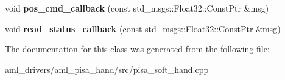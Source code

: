 \begin{DoxyCompactItemize}
\item 
\hypertarget{class_pisa_soft_hand_afece44618b89e2c0553a206a0729b03e}{void {\bfseries pos\-\_\-cmd\-\_\-callback} (const std\-\_\-msgs\-::\-Float32\-::\-Const\-Ptr \&msg)}\label{class_pisa_soft_hand_afece44618b89e2c0553a206a0729b03e}

\item 
\hypertarget{class_pisa_soft_hand_afe62272619863f9e7194336f1eb58b22}{void {\bfseries read\-\_\-status\-\_\-callback} (const std\-\_\-msgs\-::\-Float32\-::\-Const\-Ptr \&msg)}\label{class_pisa_soft_hand_afe62272619863f9e7194336f1eb58b22}

\end{DoxyCompactItemize}


The documentation for this class was generated from the following file\-:\begin{DoxyCompactItemize}
\item 
aml\-\_\-drivers/aml\-\_\-pisa\-\_\-hand/src/pisa\-\_\-soft\-\_\-hand.\-cpp\end{DoxyCompactItemize}
